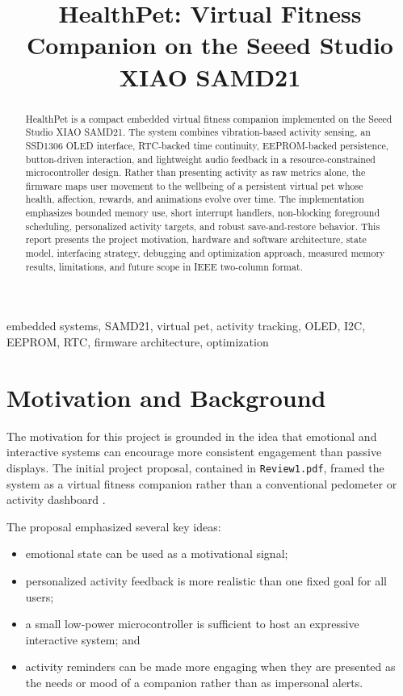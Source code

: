 \documentclass[conference]{IEEEtran}
\title{HealthPet: Virtual Fitness Companion on the Seeed Studio XIAO SAMD21}
\author{
\IEEEauthorblockN{Author Details To Be Added}
\IEEEauthorblockA{Institution or Course Details}
}
\begin{document}
\maketitle

\begin{abstract}
HealthPet is a compact embedded virtual fitness companion implemented on the Seeed Studio XIAO SAMD21. The system combines vibration-based activity sensing, an SSD1306 OLED interface, RTC-backed time continuity, EEPROM-backed persistence, button-driven interaction, and lightweight audio feedback in a resource-constrained microcontroller design. Rather than presenting activity as raw metrics alone, the firmware maps user movement to the wellbeing of a persistent virtual pet whose health, affection, rewards, and animations evolve over time. The implementation emphasizes bounded memory use, short interrupt handlers, non-blocking foreground scheduling, personalized activity targets, and robust save-and-restore behavior. This report presents the project motivation, hardware and software architecture, state model, interfacing strategy, debugging and optimization approach, measured memory results, limitations, and future scope in IEEE two-column format.
\end{abstract}

\begin{IEEEkeywords}
embedded systems, SAMD21, virtual pet, activity tracking, OLED, I2C, EEPROM, RTC, firmware architecture, optimization
\end{IEEEkeywords}

\section{Motivation and Background}
The motivation for this project is grounded in the idea that emotional and interactive systems can encourage more consistent engagement than passive displays. The initial project proposal, contained in \texttt{Review1.pdf}, framed the system as a virtual fitness companion rather than a conventional pedometer or activity dashboard \cite{review1}.

The proposal emphasized several key ideas:
\begin{itemize}
\item emotional state can be used as a motivational signal;
\item personalized activity feedback is more realistic than one fixed goal for all users;
\item a small low-power microcontroller is sufficient to host an expressive interactive system; and
\item activity reminders can be made more engaging when they are presented as the needs or mood of a companion rather than as impersonal alerts.
\end{itemize}
\end{document}
